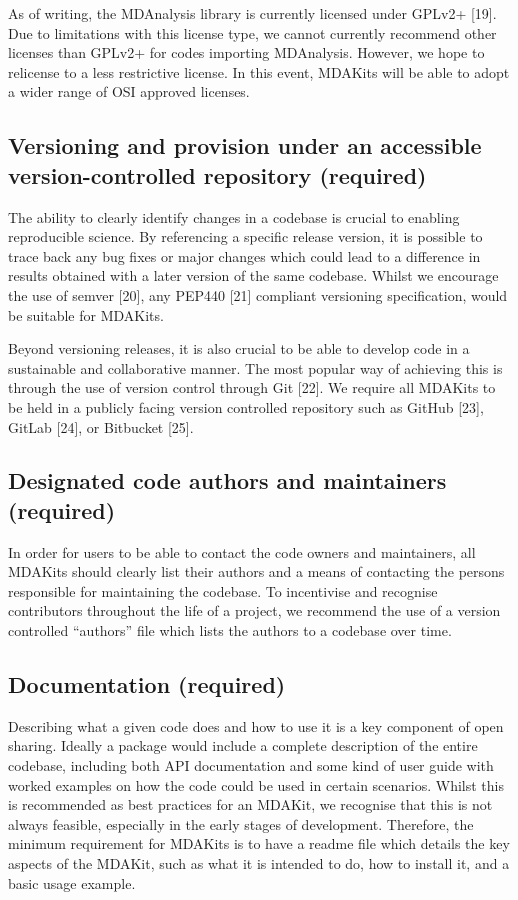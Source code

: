 \documentclass{article}
\begin{document}
As of writing, the MDAnalysis library is currently licensed under GPLv2+ [19]. Due to limitations with this license type, we cannot currently recommend other licenses than GPLv2+ for codes importing MDAnalysis. However, we hope to relicense to a less restrictive license. In this event, MDAKits will be able to adopt a wider range of OSI approved licenses.
 
\subsection{Versioning and provision under an accessible version-controlled repository (required)}

The ability to clearly identify changes in a codebase is crucial to enabling reproducible science. By referencing a specific release version, it is possible to trace back any bug fixes or major changes which could lead to a difference in results obtained with a later version of the same codebase. Whilst we encourage the use of semver [20], any PEP440 [21] compliant versioning specification, would be suitable for MDAKits.

Beyond versioning releases, it is also crucial to be able to develop code in a sustainable and collaborative manner. The most popular way of achieving this is through the use of version control through Git [22]. We require all MDAKits to be held in a publicly facing version controlled repository such as GitHub [23], GitLab [24], or Bitbucket [25].

\subsection{Designated code authors and maintainers (required)}

In order for users to be able to contact the code owners and maintainers, all MDAKits should clearly list their authors and a means of contacting the persons responsible for maintaining the codebase. To incentivise and recognise contributors throughout the life of a project, we recommend the use of a version controlled “authors” file which lists the authors to a codebase over time.
 
\subsection{Documentation (required)}

Describing what a given code does and how to use it is a key component of open sharing. Ideally a package would include a complete description of the entire codebase, including both API documentation and some kind of user guide with worked examples on how the code could be used in certain scenarios. Whilst this is recommended as best practices for an MDAKit, we recognise that this is not  always feasible, especially in the early stages of development. Therefore, the minimum requirement for MDAKits is to have a readme file which details the key aspects of the MDAKit, such as what it is intended to do, how to install it, and a basic usage example.
\end{document}
